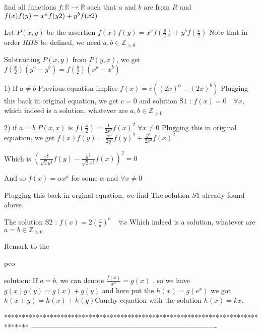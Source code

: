\begin{solution}
	\begin{tcolorbox}find all functions $f: \mathbb{R} \rightarrow \mathbb{R}$ such that $a$ and $b$ are from $R$ and 
  $f(x)f(y)=x^af(y\/2)+y^bf(x\/2)$\end{tcolorbox}
Let $P(x,y)$ be the assertion $f(x)f(y)=x^af(\frac y2)+y^bf(\frac x2)$
Note that in order $RHS$ be defined, we need $a,b\in\mathbb Z_{>0}$

Subtracting $P(x,y)$ from $P(y,x)$, we get $f(\frac x2)(y^a-y^b)=f(\frac y2)(x^a-x^b)$

1) If $a\ne b$
Previous equation implies $f(x)=c((2x)^a-(2x)^b)$
Plugging this back in original equation, we get $c=0$ and solution 
$\boxed{\text{S1 : }f(x)=0\quad\forall x}$, which indeed is a solution, whatever are $a,b\in\mathbb Z_{>0}$

2) if $a=b$
$P(x,x)$ is $f(\frac x2)=\frac 1{2x^a}f(x)^2$ $\forall x\ne 0$
Plugging this in original equation, we get $f(x)f(y)=\frac {x^a}{2y^a}f(y)^2+\frac {y^a}{2x^a}f(x)^2$

Which is $\left(\frac {x^{\frac a2}}{\sqrt 2y^{\frac a2}}f(y)-\frac {y^{\frac a2}}{\sqrt 2x^{\frac a2}}f(x)\right)^2=0$

And so $f(x)=\alpha x^a$ for some $\alpha$ and $\forall x\ne 0$

Plugging this back in orginal equation, we find
The solution $S1$ already found above.

The solution $\boxed{\text{S2 : }f(x)=2\left(\frac xa\right)^a\quad\forall x}$
Which indeed is a solution, whatever are $a=b\in\mathbb Z_{>0}$



\end{solution}



\begin{solution}
	Remark to the \begin{bolded}pco\end{bolded} solution: 
If $a=b$, we can denote $\frac{f(x)}{x^{a}}=g(x)$ , so we have $g(x)g(y)=g(x)+g(y)$ and here put the $h(x)=g(e^{x})$ we got $h(x+y)=h(x)+h(y)$Cauchy equation with the solution $h(x)=kx.$
\end{solution}
*******************************************************************************
-------------------------------------------------------------------------------

